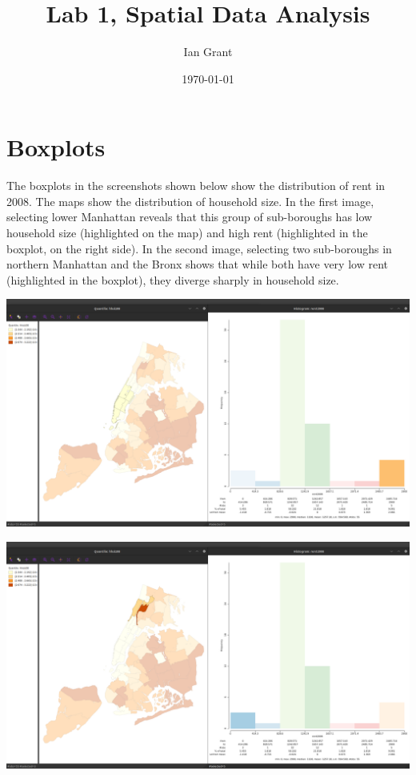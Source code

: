 \documentclass[11pt]{article}
\author{Ian Grant}
\date{\today}
\title{Lab 1, Spatial Data Analysis}
\begin{document}
\maketitle

\section{Boxplots}
\label{sec:orgf1a786f}
The boxplots in the screenshots shown below show the distribution of rent in 2008. The maps show the distribution of household size. In the first image, selecting lower Manhattan reveals that this group of sub-boroughs has low household size (highlighted on the map) and high rent (highlighted in the boxplot, on the right side). In the second image, selecting two sub-boroughs in northern Manhattan and the Bronx shows that while both have very low rent (highlighted in the boxplot), they diverge sharply in household size.

\begin{center}
\includegraphics[width=.9\linewidth]{hist_hhsize_high.png}
\end{center}
\begin{center}
\includegraphics[width=.9\linewidth]{hist_hhsize_low.png}
\end{center}
\end{document}
